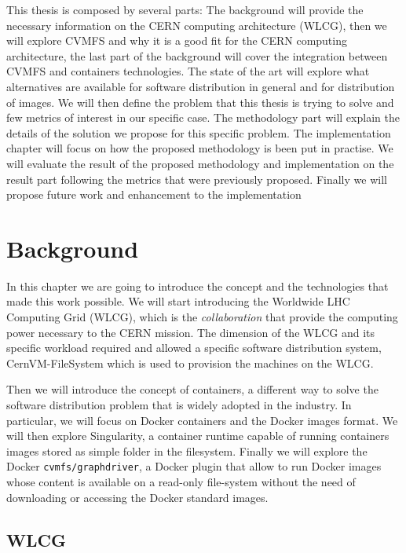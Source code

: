This thesis is composed by several parts: The background will provide the
necessary information on the CERN computing architecture (WLCG), then we will
explore CVMFS and why it is a good fit for the CERN computing architecture, the
last part of the background will cover the integration between CVMFS and
containers technologies.  The state of the art will explore what alternatives
are available for software distribution in general and for distribution of
images.  We will then define the problem that this thesis is trying to solve
and few metrics of interest in our specific case.  The methodology part will
explain the details of the solution we propose for this specific problem.  The
implementation chapter will focus on how the proposed methodology is been put
in practise.  We will evaluate the result of the proposed methodology and
implementation on the result part following the metrics that were previously
proposed.  Finally we will propose future work and enhancement to the
implementation

\chapter{Background}\label{ch:background}

In this chapter we are going to introduce the concept and the technologies that
made this work possible.  We will start introducing the Worldwide LHC Computing
Grid (WLCG), which is the \textit{collaboration} that provide the computing power
necessary to the CERN mission. The dimension of the WLCG and its specific
workload required and allowed a specific software distribution system,
CernVM-FileSystem which is used to provision the machines on the WLCG.

Then we will introduce the concept of containers, a different way to solve the
software distribution problem that is widely adopted in the industry. In
particular, we will focus on Docker containers and the Docker images format. We
will then explore Singularity, a container runtime capable of running
containers images stored as simple folder in the filesystem. Finally we will
explore the Docker \texttt{cvmfs/graphdriver}, a Docker plugin that allow to
run Docker images whose content is available on a read-only file-system without
the need of downloading or accessing the Docker standard images.


\section{WLCG}

